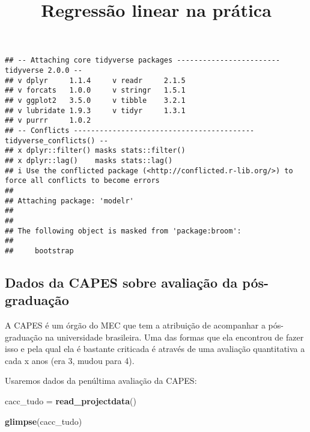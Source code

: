 \documentclass[
]{article}
\title{Regressão linear na prática}
\author{}
\date{\vspace{-2.5em}}
\newenvironment{Shaded}{\begin{snugshade}}{\end{snugshade}}
\newcommand{\FunctionTok}[1]{\textcolor[rgb]{0.13,0.29,0.53}{\textbf{#1}}}
\newcommand{\NormalTok}[1]{#1}
\newcommand{\OtherTok}[1]{\textcolor[rgb]{0.56,0.35,0.01}{#1}}
\begin{document}
\maketitle

\begin{verbatim}
## -- Attaching core tidyverse packages ------------------------ tidyverse 2.0.0 --
## v dplyr     1.1.4     v readr     2.1.5
## v forcats   1.0.0     v stringr   1.5.1
## v ggplot2   3.5.0     v tibble    3.2.1
## v lubridate 1.9.3     v tidyr     1.3.1
## v purrr     1.0.2     
## -- Conflicts ------------------------------------------ tidyverse_conflicts() --
## x dplyr::filter() masks stats::filter()
## x dplyr::lag()    masks stats::lag()
## i Use the conflicted package (<http://conflicted.r-lib.org/>) to force all conflicts to become errors
## 
## Attaching package: 'modelr'
## 
## 
## The following object is masked from 'package:broom':
## 
##     bootstrap
\end{verbatim}

\hypertarget{dados-da-capes-sobre-avaliauxe7uxe3o-da-puxf3s-graduauxe7uxe3o}{%
\subsection{Dados da CAPES sobre avaliação da
pós-graduação}\label{dados-da-capes-sobre-avaliauxe7uxe3o-da-puxf3s-graduauxe7uxe3o}}

A CAPES é um órgão do MEC que tem a atribuição de acompanhar a
pós-graduação na universidade brasileira. Uma das formas que ela
encontrou de fazer isso e pela qual ela é bastante criticada é através
de uma avaliação quantitativa a cada x anos (era 3, mudou para 4).

Usaremos dados da penúltima avaliação da CAPES:

\begin{Shaded}
\begin{Highlighting}[]
\NormalTok{cacc\_tudo }\OtherTok{=} \FunctionTok{read\_projectdata}\NormalTok{()}

\FunctionTok{glimpse}\NormalTok{(cacc\_tudo)}
\end{Highlighting}
\end{Shaded}
\end{document}
